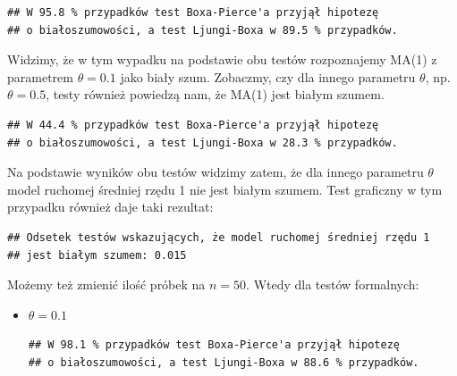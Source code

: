 \documentclass[10pt, a4paper]{article}\usepackage[]{graphicx}\usepackage[]{xcolor}
\makeatletter
\newenvironment{kframe}{%
 \def\at@end@of@kframe{}%
 \ifinner\ifhmode%
  \def\at@end@of@kframe{\end{minipage}}%
  \begin{minipage}{\columnwidth}%
 \fi\fi%
 \def\FrameCommand##1{\hskip\@totalleftmargin \hskip-\fboxsep
 \colorbox{shadecolor}{##1}\hskip-\fboxsep
     \hskip-\linewidth \hskip-\@totalleftmargin \hskip\columnwidth}%
 \MakeFramed {\advance\hsize-\width
   \@totalleftmargin\z@ \linewidth\hsize
   \@setminipage}}%
 {\par\unskip\endMakeFramed%
 \at@end@of@kframe}
\newenvironment{knitrout}{}{} %
\makeatother
\begin{document}
\begin{enumerate}
\begin{knitrout}
\color{fgcolor}\begin{kframe}
\begin{verbatim}
## W 95.8 % przypadków test Boxa-Pierce'a przyjął hipotezę 
## o białoszumowości, a test Ljungi-Boxa w 89.5 % przypadków.
\end{verbatim}
\end{kframe}
\end{knitrout}
Widzimy, że w tym wypadku na podstawie obu testów rozpoznajemy MA(1) z parametrem $\theta=0.1$ jako biały szum. Zobaczmy, czy dla innego parametru $\theta$, np. $\theta=0.5$, testy również powiedzą nam, że MA(1) jest białym szumem.
\begin{knitrout}
\color{fgcolor}\begin{kframe}
\begin{verbatim}
## W 44.4 % przypadków test Boxa-Pierce'a przyjął hipotezę 
## o białoszumowości, a test Ljungi-Boxa w 28.3 % przypadków.
\end{verbatim}
\end{kframe}
\end{knitrout}
Na podstawie wyników obu testów widzimy zatem, że dla innego parametru $\theta$ model ruchomej średniej rzędu 1 nie jest białym szumem. Test graficzny w tym przypadku również daje taki rezultat:
\begin{knitrout}
\color{fgcolor}\begin{kframe}
\begin{verbatim}
## Odsetek testów wskazujących, że model ruchomej średniej rzędu 1
## jest białym szumem: 0.015
\end{verbatim}
\end{kframe}
\end{knitrout}
Możemy też zmienić ilość próbek na $n=50$. Wtedy dla testów formalnych:
\begin{itemize}
\item $\theta=0.1$
\begin{knitrout}
\color{fgcolor}\begin{kframe}
\begin{verbatim}
## W 98.1 % przypadków test Boxa-Pierce'a przyjął hipotezę 
## o białoszumowości, a test Ljungi-Boxa w 88.6 % przypadków.
\end{verbatim}
\end{kframe}

\end{knitrout}
\end{itemize}
\end{enumerate}
\end{document}
